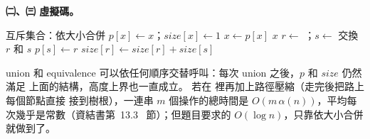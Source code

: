 \begin{pastsoln}
\textbf{㈡、㈢ 虛擬碼。}
\begin{pseudo}{互斥集合：依大小合併}
        \State $p[x] \gets x$；$\mathit{size}[x] \gets 1$
    \EndFor
\EndProcedure
{}
        \State $x \gets p[x]$ 
    \EndWhile
    \State \Return $x$
\EndFunction
{}
    \State $r \gets$ ；$s \gets$ 
        \State \Return {}
    \EndIf
        \State 交換 $r$ 和 $s$ 
    \EndIf
    \State $p[s] \gets r$ 
    \State $\mathit{size}[r] \gets \mathit{size}[r] + \mathit{size}[s]$
\EndProcedure
{}
        \State \Return \TRUE
    \Else
        \State \Return \FALSE
    \EndIf
\EndFunction
\end{pseudo}
union 和 equivalence 可以依任何順序交替呼叫：每次 union 之後，$p$ 和 $\mathit{size}$ 仍然滿足
上面的結構，高度上界也一直成立。 若在  裡再加上路徑壓縮（走完後把路上每個節點直接
接到樹根），一連串 $m$ 個操作的總時間是 $O(m\,\alpha(n))$，平均每次幾乎是常數（資結書第~13.3~
節）；但題目要求的 $O(\log n)$，只靠依大小合併就做到了。
\end{pastsoln}
